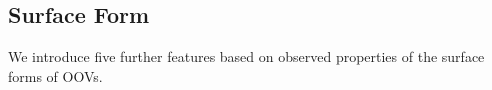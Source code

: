 \documentclass[10pt, a4paper]{article}
\begin{document}









\subsection{Surface Form}

We introduce five further features based on observed properties of the
surface forms of OOVs.
\end{document}
